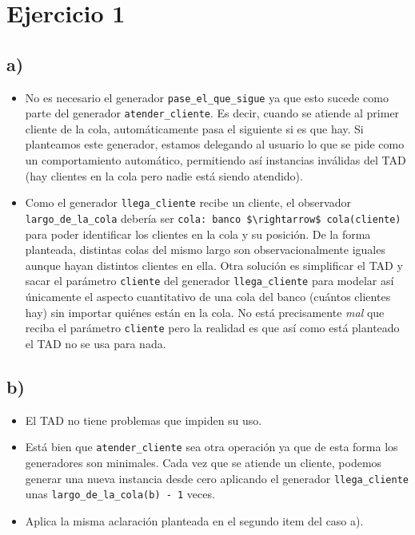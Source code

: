 \section*{Ejercicio 1}

\subsection*{a)}

\begin{itemize}
    \item No es necesario el generador \lstinline{pase_el_que_sigue} ya que esto sucede como parte del generador \lstinline{atender_cliente}. Es decir, cuando se atiende al primer cliente de la cola, automáticamente pasa el siguiente si es que hay. Si planteamos este generador, estamos delegando al usuario lo que se pide como un comportamiento automático, permitiendo así instancias inválidas del TAD (hay clientes en la cola pero nadie está siendo atendido).
    \item Como el generador \lstinline{llega_cliente} recibe un cliente, el observador \lstinline{largo_de_la_cola} debería ser \lstinline{cola: banco $\rightarrow$ cola(cliente)} para poder identificar los clientes en la cola y su posición. De la forma planteada, distintas colas del mismo largo son observacionalmente iguales aunque hayan distintos clientes en ella. Otra solución es simplificar el TAD y sacar el parámetro \lstinline{cliente} del generador \lstinline{llega_cliente} para modelar así únicamente el aspecto cuantitativo de una cola del banco (cuántos clientes hay) sin importar quiénes están en la cola. No está precisamente \emph{mal} que reciba el parámetro \lstinline{cliente} pero la realidad es que así como está planteado el TAD no se usa para nada.
\end{itemize}

\subsection*{b)}

\begin{itemize}
    \item El TAD no tiene problemas que impiden su uso.
    \item Está bien que \lstinline{atender_cliente} sea otra operación ya que de esta forma los generadores son minimales. Cada vez que se atiende un cliente, podemos generar una nueva instancia desde cero aplicando el generador \lstinline{llega_cliente} unas \lstinline{largo_de_la_cola(b) - 1} veces.
    \item Aplica la misma aclaración planteada en el segundo item del caso a).
\end{itemize}

